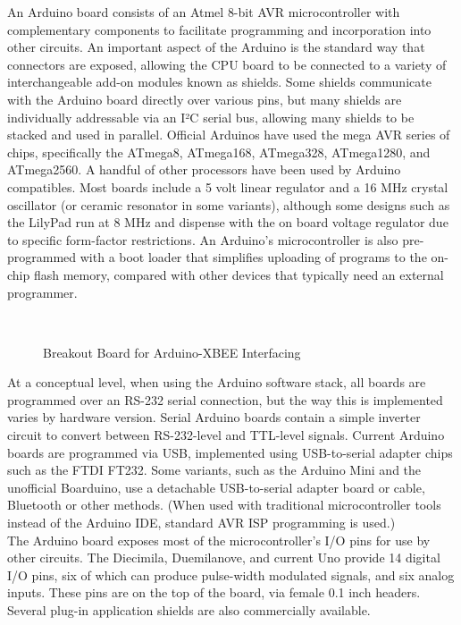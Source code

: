 \documentclass[a4paper, 12pt, notitlepage]{report}
\begin{document}
An Arduino board consists of an Atmel 8-bit AVR microcontroller with complementary components to facilitate programming and incorporation into other circuits. An important aspect of the Arduino is the standard way that connectors are exposed, allowing the CPU board to be connected to a variety of interchangeable add-on modules known as shields. Some shields communicate with the Arduino board directly over various pins, but many shields are individually addressable via an I²C serial bus, allowing many shields to be stacked and used in parallel. Official Arduinos have used the mega AVR series of chips, specifically the ATmega8, ATmega168, ATmega328, ATmega1280, and ATmega2560. A handful of other processors have been used by Arduino compatibles. Most boards include a 5 volt linear regulator and a 16 MHz crystal oscillator (or ceramic resonator in some variants), although some designs such as the LilyPad run at 8 MHz and dispense with the on board voltage regulator due to specific form-factor restrictions. An Arduino's microcontroller is also pre-programmed with a boot loader that simplifies uploading of programs to the on-chip flash memory, compared with other devices that typically need an external programmer. \\

\begin{figure}[h!]
{\par}
\caption{Breakout Board for Arduino-XBEE Interfacing} \\
\end{figure}
 

At a conceptual level, when using the Arduino software stack, all boards are programmed over an RS-232 serial connection, but the way this is implemented varies by hardware version. Serial Arduino boards contain a simple inverter circuit to convert between RS-232-level and TTL-level signals. Current Arduino boards are programmed via USB, implemented using USB-to-serial adapter chips such as the FTDI FT232. Some variants, such as the Arduino Mini and the unofficial Boarduino, use a detachable USB-to-serial adapter board or cable, Bluetooth or other methods. (When used with traditional microcontroller tools instead of the Arduino IDE, standard AVR ISP programming is used.)\\

The Arduino board exposes most of the microcontroller's I/O pins for use by other circuits. The Diecimila, Duemilanove, and current Uno provide 14 digital I/O pins, six of which can produce pulse-width modulated signals, and six analog inputs. These pins are on the top of the board, via female 0.1 inch headers. Several plug-in application shields are also commercially available.\\
\end{document}
